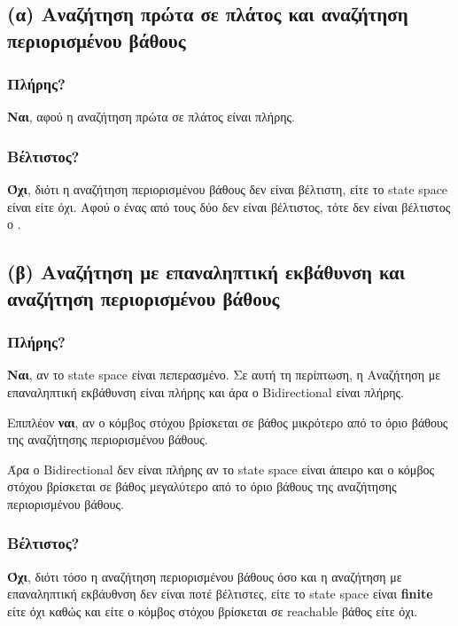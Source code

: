 \documentclass{article}
\begin{document}
\subsection*{(α) Αναζήτηση πρώτα σε πλάτος και αναζήτηση περιορισμένου βάθους}
\subsubsection*{Πλήρης?}
\textbf{Ναι}, αφού η αναζήτηση πρώτα σε πλάτος είναι πλήρης.



\subsubsection*{Βέλτιστος?}

\textbf{Όχι}, διότι η αναζήτηση περιορισμένου βάθους δεν είναι βέλτιστη, είτε το \textlatin{state space} είναι  είτε όχι. Αφού ο ένας από τους δύο δεν είναι βέλτιστος, τότε δεν είναι βέλτιστος ο .

\subsection*{(β) Αναζήτηση με επαναληπτική εκβάθυνση και αναζήτηση περιορισμένου βάθους\\}
\subsubsection*{Πλήρης?}
\textbf{Ναι}, αν το \textlatin{state space} είναι πεπερασμένο. Σε αυτή τη περίπτωση, η Αναζήτηση με επαναληπτική εκβάθυνση είναι πλήρης και άρα ο \textlatin{Bidirectional} είναι πλήρης.

Επιπλέον \textbf{ναι}, αν ο κόμβος στόχου βρίσκεται σε βάθος μικρότερο από το όριο βάθους της αναζήτησης περιορισμένου βάθους.

Άρα ο \textlatin{Bidirectional} δεν είναι πλήρης αν το \textlatin{state space} είναι άπειρο και ο κόμβος στόχου βρίσκεται σε βάθος μεγαλύτερο από το όριο βάθους της αναζήτησης περιορισμένου βάθους. 

\subsubsection*{Βέλτιστος?}
\textbf{Όχι}, διότι τόσο η αναζήτηση περιορισμένου βάθους όσο και η αναζήτηση με επαναληπτική εκβάυθνση  δεν είναι ποτέ βέλτιστες, είτε το \textlatin{state space} είναι \textbf{finite} είτε όχι καθώς και είτε ο κόμβος στόχου βρίσκεται σε \textlatin{reachable} βάθος είτε όχι.
\end{document}
